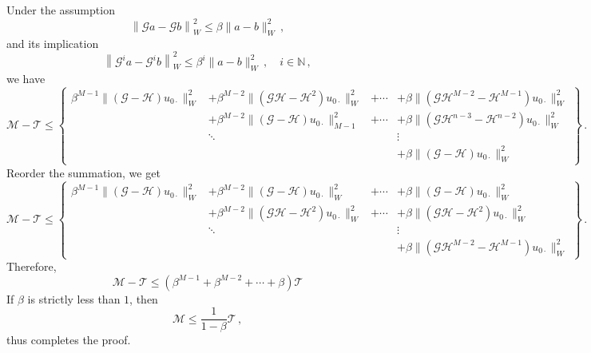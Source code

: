 \normalsize
Under the assumption
\begin{equation*}
    \left\| \mathcal{G}a - \mathcal{G}b \right\|^2_{W} \le \beta \|a-b\|^2_{W}\,,
\end{equation*}
and its implication
\begin{equation*}
    \left\|\mathcal{G}^i a - \mathcal{G}^i b\right\|^2_W \le \beta^i \|a-b\|_W^2\,, \quad i\in \mathbb{N}\,,
\end{equation*}
we have
\begin{equation*}
    \mathcal{M} - \mathcal{T} \le 
    \left\{\begin{split}
        \beta^{M-1}\|(\mathcal{G} - \mathcal{H})u_{0\cdot}\|^2_W &+ \beta^{M-2}\|(\mathcal{G}\mathcal{H} - \mathcal{H}^2)u_{0\cdot}\|^2_W&+\cdots
        &+ \beta\|(\mathcal{G}\mathcal{H}^{M-2} - \mathcal{H}^{M-1})u_{0\cdot}\|^2_W\\
        &+\beta^{M-2}\|( \mathcal{G} - \mathcal{H})u_{0\cdot}\|^2_{M-1} &+ \cdots 
        &+ \beta\|(\mathcal{G}\mathcal{H}^{n-3} - \mathcal{H}^{n-2})u_{0\cdot}\|^2_W\\
        &\ddots&& \vdots\\
        &&& + \beta\|(\mathcal{G} - \mathcal{H})u_{0\cdot}\|^2_W
    \end{split}
    \right\}\,.
    \label{error diff}
\end{equation*}
Reorder the summation, we get
\begin{equation*}
    \mathcal{M} - \mathcal{T} \le 
    \left\{\begin{split}
        \beta^{M-1}\|(\mathcal{G} - \mathcal{H})u_{0\cdot}\|^2_W &+ \beta^{M-2}\|(\mathcal{G} - \mathcal{H})u_{0\cdot}\|^2_W&+\cdots
        &+ \beta\|(\mathcal{G} - \mathcal{H})u_{0\cdot}\|^2_W\\
        &+\beta^{M-2}\|( \mathcal{G}\mathcal{H} - \mathcal{H}^2)u_{0\cdot}\|^2_W &+ \cdots 
        &+ \beta\|(\mathcal{G}\mathcal{H} - \mathcal{H}^{2})u_{0\cdot}\|^2_W\\
        &\ddots&& \vdots\\
        &&& + \beta\|(\mathcal{G}\mathcal{H}^{M-2} - \mathcal{H}^{M-1})u_{0\cdot}\|^2_W
    \end{split}
    \right\}\,.
    \label{error diff 2}
\end{equation*}
Therefore,
\begin{equation*}
    \mathcal{M} - \mathcal{T} \le \left(\beta^{M-1} + \beta^{M-2} + \cdots + \beta \right)
    \mathcal{T}
\end{equation*}
If $\beta$ is strictly less than $1$, then
\begin{equation*}
    \mathcal{M} \le \frac{1}{1-\beta} \mathcal{T}\,,
\end{equation*}
thus completes the proof.\hfill\qedsymbol


